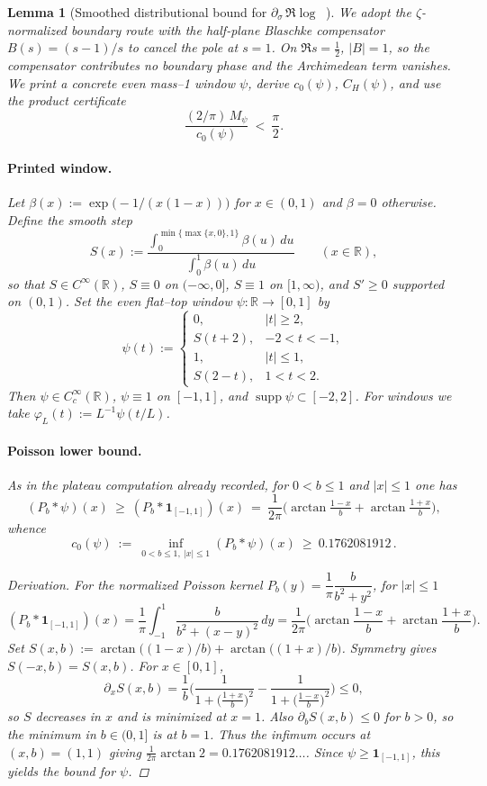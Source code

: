 \documentclass[11pt]{article}
\newtheorem{lemma}[theorem]{Lemma}
\theoremstyle{definition}
\theoremstyle{remark}
\newcommand{\R}{\mathbb{R}}
\newcommand{\Poisson}{P}
\DeclareMathOperator{\dettwo}{det_2}
\begin{document}
\begin{lemma}[Smoothed distributional bound for $\partial_\sigma\,\Re\log\dettwo$]
 
We adopt the \(\zeta\)-normalized boundary route with the half-plane Blaschke compensator \(B(s)=(s-1)/s\) to cancel the pole at \(s=1\). On \(\Re s=\tfrac12\), \(|B|=1\), so the compensator contributes no boundary phase and the Archimedean term vanishes. We print a concrete even mass--1 window \(\psi\), derive \(c_0(\psi)\), \(C_H(\psi)\), and use the product certificate
\[
  \frac{(2/\pi)\,M_\psi}{c_0(\psi)}\ <\ \frac{\pi}{2}.
\]
\paragraph{Printed window.}
Let \(\beta(x):=\exp\!\big(-1/(x(1-x))\big)\) for \(x\in(0,1)\) and \(\beta=0\) otherwise. Define the smooth step
\[
  S(x):=\frac{\int_0^{\min\{\max\{x,0\},1\}} \beta(u)\,du}{\int_0^{1} \beta(u)\,du}\qquad (x\in\R),
\]
so that \(S\in C^\infty(\R)\), \(S\equiv 0\) on \(({-}\infty,0]\), \(S\equiv1\) on \([1,\infty)\), and \(S'\ge 0\) supported on \((0,1)\). Set the even flat--top window \(\psi:\R\to[0,1]\) by
\[
  \psi(t):=\begin{cases}
    0,& |t|\ge 2,\\
    S(t+2),& -2<t<-1,\\
    1,& |t|\le 1,\\
    S(2-t),& 1<t<2.
  \end{cases}
\]
Then \(\psi\in C_c^\infty(\R)\), \(\psi\equiv1\) on \([-1,1]\), and \(\operatorname{supp}\psi\subset[-2,2]\). For windows we take \(\varphi_L(t):=L^{-1}\psi(t/L)\).

\paragraph{Poisson lower bound.}
As in the plateau computation already recorded, for \(0<b\le 1\) and \(|x|\le 1\) one has
\[
 (\Poisson_b*\psi)(x)\ \ge\ (\Poisson_b*\mathbf 1_{[-1,1]})(x)
 \ =\ \frac{1}{2\pi}\Big(\arctan\tfrac{1-x}{b}+\arctan\tfrac{1+x}{b}\Big),
\]
whence
\[
 c_0(\psi)\ :=\ \inf_{0<b\le 1,\ |x|\le 1} (\Poisson_b*\psi)(x)\ \ge\ 0.1762081912\,.
\]
\begin{proof}[Derivation]
For the normalized Poisson kernel \(P_b(y)=\dfrac{1}{\pi}\dfrac{b}{b^2+y^2}\), for \(|x|\le 1\)
\[
 (P_b*\mathbf 1_{[-1,1]})(x)=\frac{1}{\pi}\int_{-1}^{1}\frac{b}{b^2+(x-y)^2}\,dy=\frac{1}{2\pi}\Big(\arctan\frac{1-x}{b}+\arctan\frac{1+x}{b}\Big).
\]
Set \(S(x,b):=\arctan\big((1-x)/b\big)+\arctan\big((1+x)/b\big)\). Symmetry gives \(S(-x,b)=S(x,b)\). For \(x\in[0,1]\),
\[
 \partial_x S(x,b)=\frac{1}{b}\Big(\frac{1}{1+\big(\tfrac{1+x}{b}\big)^2}-\frac{1}{1+\big(\tfrac{1-x}{b}\big)^2}\Big)\le 0,
\]
so \(S\) decreases in \(x\) and is minimized at \(x=1\). Also \(\partial_b S(x,b)\le 0\) for \(b>0\), so the minimum in \(b\in(0,1]\) is at \(b=1\). Thus the infimum occurs at \((x,b)=(1,1)\) giving \(\frac{1}{2\pi}\arctan 2=0.1762081912\ldots\). Since \(\psi\ge \mathbf 1_{[-1,1]}\), this yields the bound for \(\psi\).
\end{proof}


\end{lemma}
\end{document}
